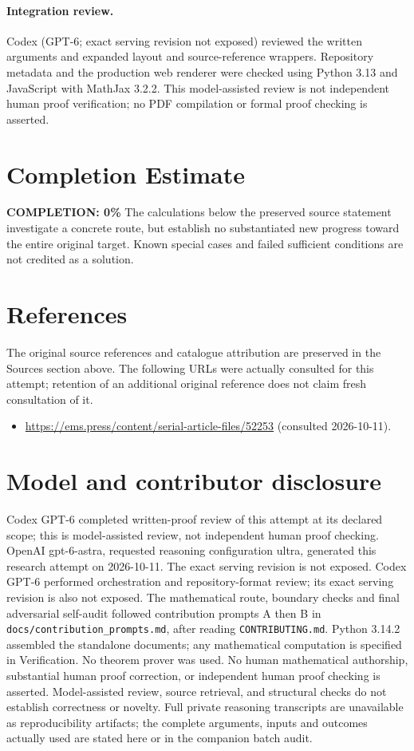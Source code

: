 \documentclass[11pt]{article}
\begin{document}
\paragraph{Integration review.} Codex (GPT-6; exact serving revision not exposed) reviewed the written arguments and expanded layout and source-reference wrappers. Repository metadata and the production web renderer were checked using Python 3.13 and JavaScript with MathJax 3.2.2. This model-assisted review is not independent human proof verification; no PDF compilation or formal proof checking is asserted.

\section{Completion Estimate}
\noindent\textbf{COMPLETION: 0\%}
The calculations below the preserved source statement investigate a concrete route,
but establish no substantiated new progress toward the entire original target.
Known special cases and failed sufficient conditions are not credited as a solution.
\section{References}
The original source references and catalogue attribution are preserved in the
Sources section above. The following URLs were actually consulted for this attempt;
retention of an additional original reference does not claim fresh consultation of it.
\begin{itemize}
\item \url{https://ems.press/content/serial-article-files/52253} (consulted 2026-10-11). 
\end{itemize}
\section{Model and contributor disclosure}
Codex GPT-6 completed written-proof review of this attempt at its declared scope; this is model-assisted review, not independent human proof checking.
OpenAI gpt-6-astra, requested reasoning configuration ultra, generated this research
attempt on 2026-10-11. The exact serving revision is not exposed. Codex GPT-6
performed orchestration and repository-format review; its exact serving revision
is also not exposed. The mathematical route, boundary checks and final adversarial
self-audit followed contribution prompts A then B in
\texttt{docs/contribution\_prompts.md}, after reading \texttt{CONTRIBUTING.md}.
Python 3.14.2 assembled the standalone documents; any mathematical computation is
specified in Verification. No theorem prover was used. No human mathematical
authorship, substantial human proof correction, or independent human proof checking
is asserted. Model-assisted review, source retrieval, and structural checks do not
establish correctness or novelty. Full private reasoning transcripts are unavailable
as reproducibility artifacts; the complete arguments, inputs and outcomes actually
used are stated here or in the companion batch audit.
\end{document}
